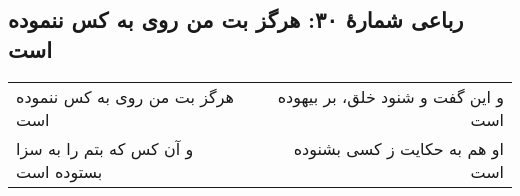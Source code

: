 \begin{center}
\section*{رباعی شمارهٔ ۳۰: هرگز بت من روی به کس ننموده است}
\label{sec:030}
\begin{longtable}{l p{0.5cm} r}
هرگز بت من روی به کس ننموده است
&&
و این گفت و شنود خلق، بر بیهوده است
\\
و آن کس که بتم را به سزا بستوده است
&&
او هم به حکایت ز کسی بشنوده است
\\
\end{longtable}
\end{center}
